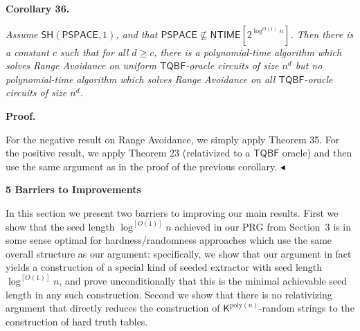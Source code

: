 \documentclass[10pt,a4paper]{article}
\begin{document}


\par\medskip\noindent\textbf{
\textbf{Corollary 36}\textbf{.}
}\par



\emph{Assume $\mathsf{SH}({\mathsf{PSPACE}},1)$, and that ${\mathsf{PSPACE}}\not\subseteq{\mathsf{NTIME}}[2^{\log^{O(1)}n}]$. Then there is a constant $c$ such that for all $d\geq c$, there is a polynomial-time algorithm which solves Range Avoidance on uniform $\mathsf{TQBF}$-oracle circuits of size $n^{d}$ but no polynomial-time algorithm which solves Range Avoidance on all $\mathsf{TQBF}$-oracle circuits of size $n^{d}$.}\par







\par\medskip\noindent\textbf{Proof.}\par




For the negative result on Range Avoidance, we simply apply Theorem 35. For the positive result, we apply Theorem 23 (relativized to a $\mathsf{TQBF}$ oracle) and then use the same argument as in the proof of the previous corollary.
$\blacktriangleleft$\par







\par\medskip\noindent\textbf{
5 Barriers to Improvements}\par




In this section we present two barriers to improving our main results. First we show that the seed length $\log^{[O(1)]}n$ achieved in our PRG from Section 3 is in some sense optimal for hardness/randomness approaches which use the same overall structure as our argument: specifically, we show that our argument in fact yields a construction of a special kind of seeded extractor with seed length $\log^{[O(1)]}n$, and prove unconditionally that this is the minimal achievable seed length in any such construction. Second we show that there is no relativizing argument that directly reduces the construction of ${\mathsf{K}}^{\mathrm{poly}(n)}$-random strings to the construction of hard truth tables.\par
\end{document}
